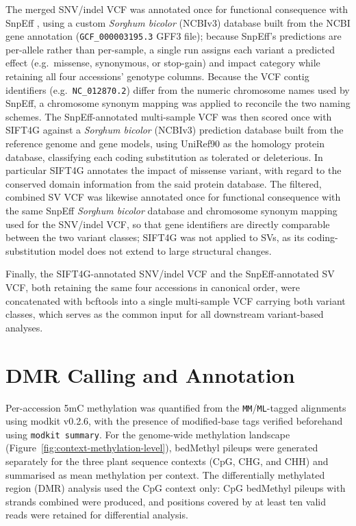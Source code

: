 \hspace{1em}The merged SNV/indel VCF was annotated once for functional consequence with SnpEff \cite{cingolaniProgramAnnotatingPredicting2012b}, using a custom \textit{Sorghum bicolor} (NCBIv3) database built from the NCBI gene annotation (\texttt{GCF\_000003195.3} GFF3 file); because SnpEff's predictions are per-allele rather than per-sample, a single run assigns each variant a predicted effect (e.g.\ missense, synonymous, or stop-gain) and impact category while retaining all four accessions' genotype columns. Because the VCF contig identifiers (e.g.\ \texttt{NC\_012870.2}) differ from the numeric chromosome names used by SnpEff, a chromosome synonym mapping was applied to reconcile the two naming schemes. The SnpEff-annotated multi-sample VCF was then scored once with SIFT4G \cite{vaserSIFTMissensePredictions2016a} against a \textit{Sorghum bicolor} (NCBIv3) prediction database built from the reference genome and gene models, using UniRef90 as the homology protein database, classifying each coding substitution as tolerated or deleterious. In particular SIFT4G annotates the impact of missense variant, with regard to the conserved domain information from the said protein database. The filtered, combined SV VCF was likewise annotated once for functional consequence with the same SnpEff \textit{Sorghum bicolor} database and chromosome synonym mapping used for the SNV/indel VCF, so that gene identifiers are directly comparable between the two variant classes; SIFT4G was not applied to SVs, as its coding-substitution model does not extend to large structural changes.

\hspace{1em}Finally, the SIFT4G-annotated SNV/indel VCF and the SnpEff-annotated SV VCF, both retaining the same four accessions in canonical order, were concatenated with bcftools into a single multi-sample VCF carrying both variant classes, which serves as the common input for all downstream variant-based analyses.

\section{DMR Calling and Annotation}
\hspace{1em}Per-accession 5mC methylation was quantified from the \texttt{MM}/\texttt{ML}-tagged alignments using modkit v0.2.6, with the presence of modified-base tags verified beforehand using \texttt{modkit summary}. For the genome-wide methylation landscape (Figure~\ref{fig:context-methylation-level}), bedMethyl pileups were generated separately for the three plant sequence contexts (CpG, CHG, and CHH) and summarised as mean methylation per context. The differentially methylated region (DMR) analysis used the CpG context only: CpG bedMethyl pileups with strands combined were produced, and positions covered by at least ten valid reads were retained for differential analysis.

